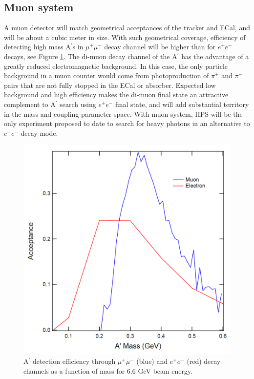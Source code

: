 \subsection{Muon system}

\label{sec:muon}


A muon detector will match geometrical acceptances of the tracker and ECal, and will be about a cubic meter in size. With such geometrical coverage, efficiency of detecting high mass A$^\prime$s in $\mu^+\mu^-$ decay channel will be higher than for $e^+e^-$ decays, see Figure \ref{fig:muacc}. The di-muon decay channel of the A$^\prime$ has the advantage of a greatly reduced electromagnetic background.  In this case, the only particle background in a muon counter would come from photoproduction of $\pi^+$ and $\pi^-$ pairs that are not fully stopped in the ECal or absorber.  Expected low background and high efficiency makes the di-muon final state an attractive complement to A$^\prime$ search using $e^+e^-$ final state, and will add substantial territory in the mass and coupling parameter space. With muon system, HPS will be the only experiment proposed to date to search for heavy photons in an alternative to $e^+e^-$ decay mode.

\begin{figure}[!ht]
\includegraphics[scale=0.4]{muon/acc.pdf}
\caption{\small{A$^\prime$ detection efficiency through $\mu^+\mu^-$ (blue) and $e^+e^-$ (red) decay channels as a function of mass for 6.6 GeV beam energy.}}\label{fig:muacc}
\end{figure}

